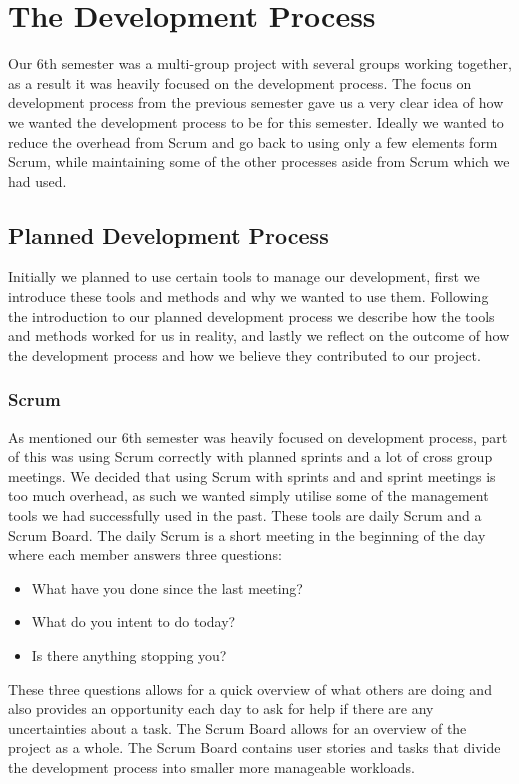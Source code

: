 \section{The Development Process}
Our 6th semester was a multi-group project with several groups working together, as a result it was heavily focused on the development process.
The focus on development process from the previous semester gave us a very clear idea of how we wanted the development process to be for this semester.
Ideally we wanted to reduce the overhead from Scrum and go back to using only a few elements form Scrum, while maintaining some of the other processes aside from Scrum which we had used.
\subsection{Planned Development Process}
Initially we planned to use certain tools to manage our development, first we introduce these tools and methods and why we wanted to use them.
Following the introduction to our planned development process we describe how the tools and methods worked for us in reality, and lastly we reflect on the outcome of how the development process and how we believe they contributed to our project.
\subsubsection{Scrum}
As mentioned our 6th semester was heavily focused on development process, part of this was using Scrum correctly with planned sprints and a lot of cross group meetings.
We decided that using Scrum with sprints and and sprint meetings is too much overhead, as such we wanted simply utilise some of the management tools we had successfully used in the past.
These tools are daily Scrum and a Scrum Board.
The daily Scrum is a short meeting in the beginning of the day where each member answers three questions:
\begin{itemize}
    \item What have you done since the last meeting?
    \item What do you intent to do today?
    \item Is there anything stopping you?
\end{itemize}
These three questions allows for a quick overview of what others are doing and also provides an opportunity each day to ask for help if there are any uncertainties about a task.
The Scrum Board allows for an overview of the project as a whole.
The Scrum Board contains user stories and tasks that divide the development process into smaller more manageable workloads.
